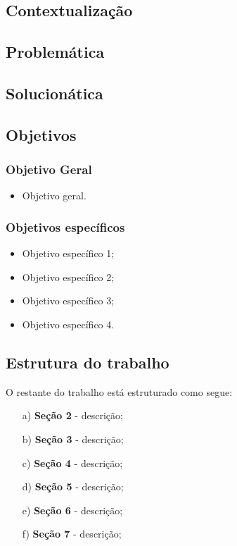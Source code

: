 
\subsection*{Contextualização}

\subsection*{Problemática}

\subsection*{Solucionática}

\subsection*{Objetivos}

\subsubsection*{Objetivo Geral}

\begin{itemize}
	\item Objetivo geral.
\end{itemize}

\subsubsection*{Objetivos específicos}
\begin{itemize}
\item Objetivo específico 1;
\item Objetivo específico 2;
\item Objetivo específico 3;
\item Objetivo específico 4.
\end{itemize}

\subsection*{Estrutura do trabalho}

O restante do trabalho está estruturado como segue:

\begin{enumerate}
\item[a)] \textbf{Seção 2} - descrição;
\item[b)] \textbf{Seção 3} - descrição;
\item[c)] \textbf{Seção 4} - descrição;
\item[d)] \textbf{Seção 5} - descrição;
\item[e)] \textbf{Seção 6} - descrição;
\item[f)] \textbf{Seção 7} - descrição;
\end{enumerate}

